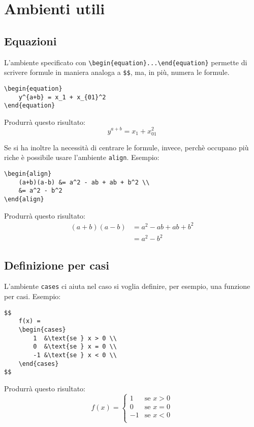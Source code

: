 \section{Ambienti utili}

\subsection{Equazioni}
L'ambiente specificato con \verb!\begin{equation}...\end{equation}! permette 
di scrivere formule in maniera analoga a \verb!$$!, ma, in più, numera le 
formule.
\begin{lstlisting}
\begin{equation}
    y^{a+b} = x_1 + x_{01}^2
\end{equation}
\end{lstlisting}
Produrrà questo risultato:\\
\begin{equation}
    y^{a+b} = x_1 + x_{01}^2
\end{equation}
\par
Se si ha inoltre la necessità di centrare le formule, invece, perchè occupano 
più riche è possibile usare l'ambiente \verb!align!. Esempio:
\begin{lstlisting}
\begin{align}
    (a+b)(a-b) &= a^2 - ab + ab + b^2 \\
    &= a^2 - b^2
\end{align}
\end{lstlisting}
Produrrà questo risultato:\\
\begin{align}
    (a+b)(a-b) &= a^2 - ab + ab + b^2 \\
    &= a^2 - b^2
\end{align}

\subsection{Definizione per casi}
L'ambiente \verb!cases! ci aiuta nel caso si voglia definire, per esempio, una 
funzione per casi. Esempio:
\begin{lstlisting}
$$
    f(x) = 
    \begin{cases}
        1  &\text{se } x > 0 \\
        0  &\text{se } x = 0 \\
        -1 &\text{se } x < 0 \\
    \end{cases}
$$
\end{lstlisting}
Produrrà questo risultato:\\
$$
    f(x) = 
    \begin{cases}
        1  &\text{se } x > 0 \\
        0  &\text{se } x = 0 \\
        -1 &\text{se } x < 0 \\
    \end{cases}
$$
